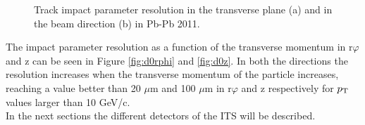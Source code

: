 \begin{figure}
  \centering
  \quad
  \caption{Track impact parameter resolution in the transverse plane (a) and in the beam direction (b) in Pb-Pb 2011.}
\end{figure}
The impact parameter resolution as a function of the transverse momentum in r$\varphi$ and z can be seen in Figure \ref{fig:d0rphi} and \ref{fig:d0z}. In both the directions the resolution increases when the transverse momentum of the particle increases, reaching a value better than 20 $\mu$m and 100 $\mu$m in r$\varphi$ and z respectively for $p_\text{T}$ values larger than 10 GeV/c.\\
In the next sections the different detectors of the ITS will be described.
